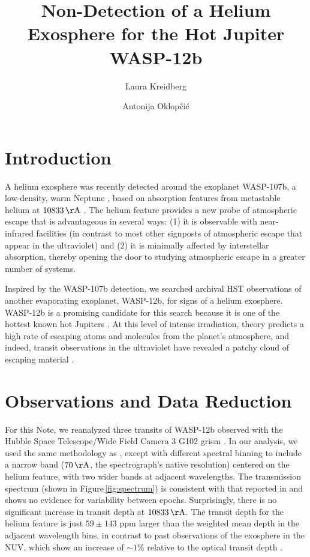 \documentclass[RNAAS]{aastex62}
\begin{document}
\title{Non-Detection of a Helium Exosphere for the Hot Jupiter WASP-12\lowercase{b}}

\author{Laura Kreidberg}

\author{Antonija Oklop\v{c}i\'{c}}

\section{Introduction}
A helium exosphere was recently detected around the exoplanet WASP-107b, a
low-density, warm Neptune \citep{spake18}, based on absorption features from metastable helium at $10833\,\mathrm{\AA}$ \citep[predicted
by][]{seager00,oklopcic18}. The helium feature provides a new probe of atmospheric escape that is
advantageous in several ways: (1) it is observable with near-infrared facilities
(in contrast to most other signposts of atmospheric escape that appear in the
ultraviolet) and (2) it is minimally affected by interstellar absorption,
thereby opening the door to studying atmospheric escape in a greater number of systems.

Inspired by the WASP-107b detection, we searched archival HST observations of
another evaporating exoplanet, WASP-12b, for signs of a helium exosphere.
WASP-12b is a promising 
candidate for this search because it is one of the hottest known hot
Jupiters \citep[$T_\mathrm{eq} = 2500$ K;][]{hebb09}. At this level of intense
irradiation, theory predicts a high rate of escaping atoms and molecules from
the planet's atmosphere, and indeed, transit observations in the ultraviolet
have revealed a patchy cloud of escaping material \citep{nichols15, salz16}.  

\section{Observations and Data Reduction}
For this Note, we reanalyzed three transits of WASP-12b observed with the
Hubble Space Telescope/Wide Field Camera 3 G102 grism \citep[originally published in][]{kreidberg15b}.  In our analysis, we used the same methodology as
\cite{kreidberg15b}, except with different spectral binning to include a narrow
band ($70\,\mathrm{\AA}$, the spectrograph's native resolution) centered on the
helium feature, with two wider bands at adjacent wavelengths. 
The transmission spectrum (shown in Figure\,\ref{fig:spectrum}) is consistent with that reported in
\cite{kreidberg15b} and shows no evidence for variability between epochs.  Surprisingly, there
is no significant increase in transit depth at $10833\,\mathrm{\AA}$. The
transit depth for the helium feature is just $59 \pm 143$ ppm larger than the
weighted mean depth in the adjacent wavelength bins, in contrast to past
observations of the exosphere in the NUV, which show an increase of $\sim1\%$
relative to the optical transit depth \citep{nichols15}.
\end{document}
